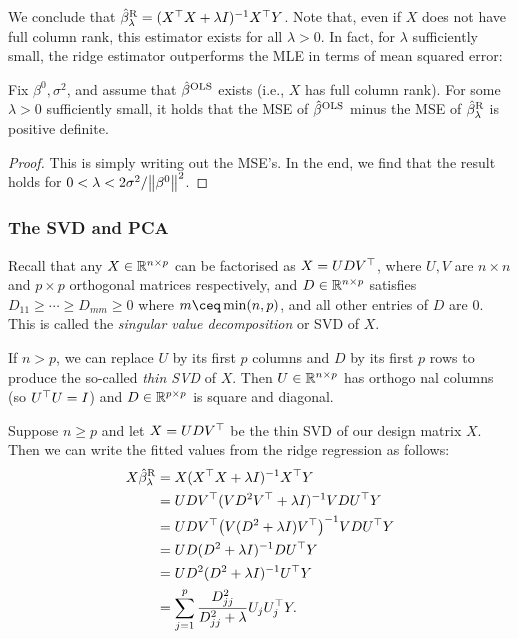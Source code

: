 We conclude that $\hat\beta^\mathrm{R}_\lambda = (X^\top X + \lambda I)^{-1} X^\top Y$. Note that, even if $X$ does not have full column rank, this estimator exists for all $\lambda > 0$.  In fact, for $\lambda$ sufficiently small, the ridge estimator outperforms the MLE in terms of mean squared error:
\begin{theorem}
    Fix $\beta^0, \sigma^2$, and assume that $\hat\beta^\mathrm{OLS}$ exists (i.e., $X$ has full column rank). For some $\lambda > 0$ sufficiently small, it holds that the MSE of $\hat\beta^\mathrm{OLS}$ minus the MSE of $\hat\beta^\mathrm{R}_\lambda$ is positive definite. 
\end{theorem}

\begin{proof}
    This is simply writing out the MSE's. In the end, we find that the result holds for $0 < \lambda < 2\sigma^2 / \norm{\beta^0}^2$. 
\end{proof}

\subsubsection{The SVD and PCA}
\begin{recap}
    Recall that any $X \in \mathbb R^{n \times p}$ can be factorised as $X = UDV^\top$, where $U, V$ are $n \times n$ and $p \times p$ orthogonal matrices respectively, and $D \in \mathbb R^{n \times p}$ satisfies $D_{11} \geq\dotsb\geq D_{mm} \geq 0$ where $m \ceq \min(n, p)$, and all other entries of $D$ are 0. This is called the \emph{singular value decomposition} or SVD of $X$. 
    
    If $n > p$, we can replace $U$ by its first $p$ columns and $D$ by its first $p$ rows to produce the so-called \emph{thin SVD} of $X$. Then $U \in \mathbb R^{n \times p}$ has orthogo nal columns (so $U^\top U = I$) and $D \in \mathbb R^{p \times p}$ is square and diagonal. 
\end{recap}

Suppose $n \geq p$ and let $X = UDV^\top$ be the thin SVD of our design matrix $X$. Then we can write the fitted values from the ridge regression as follows: 
\begin{align*}
    X\hat\beta_\lambda^\mathrm{R} &= X(X^\top X + \lambda I)^{-1} X^\top Y \\
    &= UDV^\top (VD^2V^\top + \lambda I)^{-1} VDU^\top Y \\
    &= UDV^\top \qty(V(D^2 + \lambda I)V^\top)^{-1} VDU^\top Y \\
    &= UD (D^2 + \lambda I)^{-1} DU^\top Y \\
    &= U D^2 (D^2 + \lambda I)^{-1} U^\top Y \\
    &= \sum_{j=1}^p \frac{D_{jj}^2}{D_{jj}^2 + \lambda} U_j U_j^\top Y. 
\end{align*}

